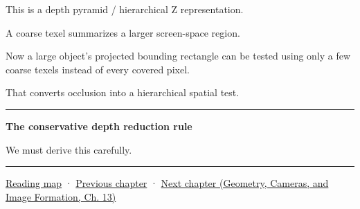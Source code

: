 This is a depth pyramid / hierarchical Z representation.

A coarse texel summarizes a larger screen-space region.

Now a large object's projected bounding rectangle can be tested using only a few coarse texels instead of every covered pixel.

That converts occlusion into a hierarchical spatial test.

\begin{center}\rule{0.5\linewidth}{0.5pt}\end{center}

\textbf{The conservative depth reduction rule}

We must derive this carefully.

\begin{center}\rule{0.5\linewidth}{0.5pt}\end{center}

\hyperref[volume-reading-map]{Reading map} · \hyperref[06-engine-ii-ch028-bvh-traversal-refitting-and-simd]{Previous chapter} · \href{../03-Geometry-Cameras-and-Image-Formation/main.pdf\#nameddest=06-engine-ii-ch030-depth-projection-and-shadow-map-precision}{Next chapter (Geometry, Cameras, and Image Formation, Ch. 13)}
